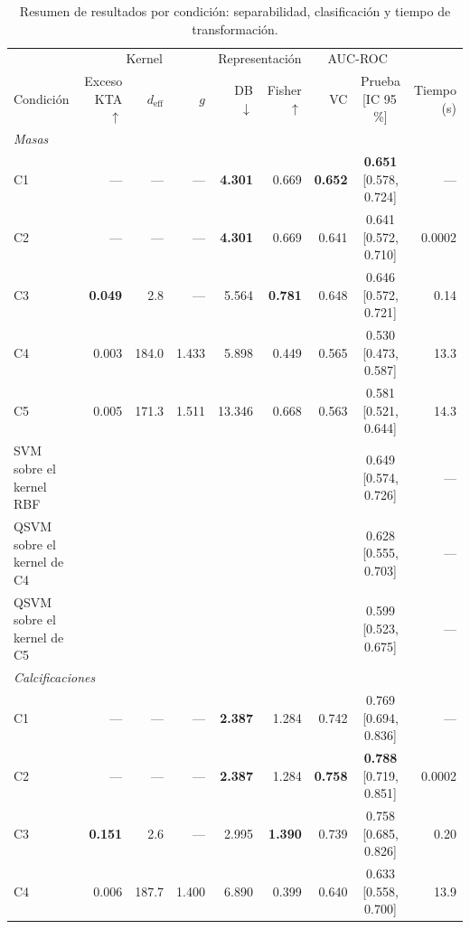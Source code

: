 \documentclass[conference,letterpaper]{IEEEtran}
\begin{document}
\begin{table}[t]
\centering
\caption{Resumen de resultados por condición: separabilidad, clasificación y tiempo de transformación.}
\label{tab:resumen}
\footnotesize
\setlength{\tabcolsep}{5pt}
\begin{tabular}{l r r r r r r c r}
\toprule
 & \multicolumn{3}{c}{Kernel} & \multicolumn{2}{c}{Representación} & \multicolumn{2}{c}{AUC-ROC} & \\ \cmidrule(lr){2-4}\cmidrule(lr){5-6}\cmidrule(lr){7-8}
Condición & Exceso KTA $\uparrow$ & $d_{\mathrm{eff}}$ & $g$ & DB $\downarrow$ & Fisher $\uparrow$ & VC & Prueba [IC 95\,\%] & Tiempo (s) \\
\midrule
\multicolumn{9}{l}{\textit{Masas}} \\
\quad C1 & --- & --- & --- & \textbf{4.301} & 0.669 & \textbf{0.652} & \textbf{0.651} [0.578, 0.724] & --- \\
\quad C2 & --- & --- & --- & \textbf{4.301} & 0.669 & 0.641 & 0.641 [0.572, 0.710] & 0.0002 \\
\quad C3 & \textbf{0.049} & 2.8 & --- & 5.564 & \textbf{0.781} & 0.648 & 0.646 [0.572, 0.721] & 0.14 \\
\quad C4 & 0.003 & 184.0 & 1.433 & 5.898 & 0.449 & 0.565 & 0.530 [0.473, 0.587] & 13.3 \\
\quad C5 & 0.005 & 171.3 & 1.511 & 13.346 & 0.668 & 0.563 & 0.581 [0.521, 0.644] & 14.3 \\
\quad SVM sobre el kernel RBF & \multicolumn{6}{c}{} & 0.649 [0.574, 0.726] & --- \\
\quad QSVM sobre el kernel de C4 & \multicolumn{6}{c}{} & 0.628 [0.555, 0.703] & --- \\
\quad QSVM sobre el kernel de C5 & \multicolumn{6}{c}{} & 0.599 [0.523, 0.675] & --- \\
\multicolumn{9}{l}{\textit{Calcificaciones}} \\
\quad C1 & --- & --- & --- & \textbf{2.387} & 1.284 & 0.742 & 0.769 [0.694, 0.836] & --- \\
\quad C2 & --- & --- & --- & \textbf{2.387} & 1.284 & \textbf{0.758} & \textbf{0.788} [0.719, 0.851] & 0.0002 \\
\quad C3 & \textbf{0.151} & 2.6 & --- & 2.995 & \textbf{1.390} & 0.739 & 0.758 [0.685, 0.826] & 0.20 \\
\quad C4 & 0.006 & 187.7 & 1.400 & 6.890 & 0.399 & 0.640 & 0.633 [0.558, 0.700] & 13.9 \\

\end{tabular}
\end{table}
\end{document}
